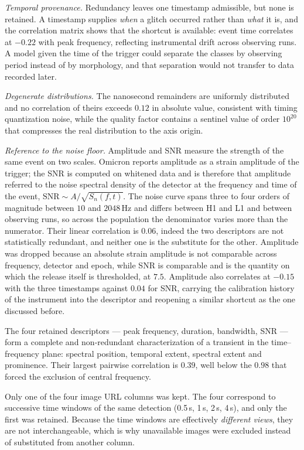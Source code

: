 \emph{Temporal provenance.} Redundancy leaves one timestamp admissible, but none is
retained. A timestamp supplies \emph{when} a glitch occurred rather than
\emph{what} it is, and the correlation matrix shows that the shortcut is available:
event time correlates at $-0.22$ with peak frequency, reflecting instrumental
drift across observing runs. A model given the time of the trigger could
separate the classes by observing period instead of by morphology, and that
separation would not transfer to data recorded later.

\emph{Degenerate distributions.} The nanosecond remainders are uniformly
distributed and no correlation of theirs exceeds $0.12$ in absolute value,
consistent with timing quantization noise, while the quality factor contains a
sentinel value of order $10^{20}$ that compresses the real distribution to the
axis origin.
 
\emph{Reference to the noise floor.} Amplitude and SNR measure the strength of
the same event on two scales. Omicron reports amplitude as a strain amplitude
of the trigger; the SNR is computed on whitened data and is therefore that
amplitude referred to the noise spectral density of the detector at the
frequency and time of the event, $\mathrm{SNR} \sim A / \sqrt{S_n(f,t)}$. The
noise curve spans three to four orders of magnitude between $10$ and
$2048$\,Hz and differs between H1 and L1 and between observing runs, so across
the population the denominator varies more than the numerator. Their linear
correlation is $0.06$, indeed the two descriptors are not statistically redundant,
and neither one is the
substitute for the other. Amplitude was dropped because an absolute strain
amplitude is not comparable across frequency, detector and epoch,
while SNR is comparable and is the quantity on which the release itself is
thresholded, at $7.5$. Amplitude also correlates at $-0.15$ with the three
timestamps against $0.04$ for SNR, carrying the calibration history of the
instrument into the descriptor and reopening a similar shortcut as the one
discussed before.
 
The four retained descriptors --- peak frequency, duration, bandwidth, SNR ---
form a complete and non-redundant characterization of a transient in the
time--frequency plane: spectral position, temporal extent, spectral extent and
prominence. Their largest pairwise correlation is $0.39$, well below the $0.98$
that forced the exclusion of central frequency.
 
Only one of the four image URL columns was kept. The four correspond to
successive time windows of the same detection (0.5\,s, 1\,s, 2\,s, 4\,s), and only the
first was retained. Because the time windows are effectively \emph{different views}, they are not interchangeable,
which is why unavailable images were excluded instead of substituted from another column.
 
